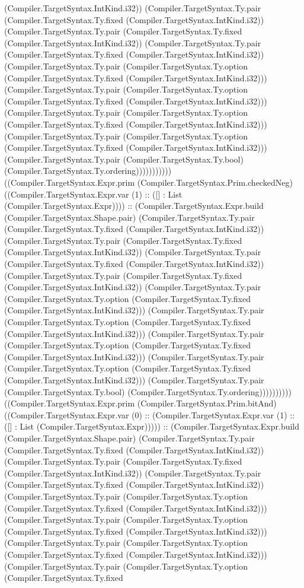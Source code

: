 \documentclass[11pt]{article}
\begin{document}
(Compiler.TargetSyntax.IntKind.i32)) (Compiler.TargetSyntax.Ty.pair (Compiler.TargetSyntax.Ty.fixed (Compiler.TargetSyntax.IntKind.i32)) (Compiler.TargetSyntax.Ty.pair (Compiler.TargetSyntax.Ty.fixed (Compiler.TargetSyntax.IntKind.i32)) (Compiler.TargetSyntax.Ty.pair (Compiler.TargetSyntax.Ty.fixed (Compiler.TargetSyntax.IntKind.i32)) (Compiler.TargetSyntax.Ty.pair (Compiler.TargetSyntax.Ty.option (Compiler.TargetSyntax.Ty.fixed (Compiler.TargetSyntax.IntKind.i32))) (Compiler.TargetSyntax.Ty.pair (Compiler.TargetSyntax.Ty.option (Compiler.TargetSyntax.Ty.fixed (Compiler.TargetSyntax.IntKind.i32))) (Compiler.TargetSyntax.Ty.pair (Compiler.TargetSyntax.Ty.option (Compiler.TargetSyntax.Ty.fixed (Compiler.TargetSyntax.IntKind.i32))) (Compiler.TargetSyntax.Ty.pair (Compiler.TargetSyntax.Ty.option (Compiler.TargetSyntax.Ty.fixed (Compiler.TargetSyntax.IntKind.i32))) (Compiler.TargetSyntax.Ty.pair (Compiler.TargetSyntax.Ty.bool) (Compiler.TargetSyntax.Ty.ordering))))))))))) ((Compiler.TargetSyntax.Expr.prim (Compiler.TargetSyntax.Prim.checkedNeg) ((Compiler.TargetSyntax.Expr.var (1) :: ([] : List (Compiler.TargetSyntax.Expr)))) :: (Compiler.TargetSyntax.Expr.build (Compiler.TargetSyntax.Shape.pair) (Compiler.TargetSyntax.Ty.pair (Compiler.TargetSyntax.Ty.fixed (Compiler.TargetSyntax.IntKind.i32)) (Compiler.TargetSyntax.Ty.pair (Compiler.TargetSyntax.Ty.fixed (Compiler.TargetSyntax.IntKind.i32)) (Compiler.TargetSyntax.Ty.pair (Compiler.TargetSyntax.Ty.fixed (Compiler.TargetSyntax.IntKind.i32)) (Compiler.TargetSyntax.Ty.pair (Compiler.TargetSyntax.Ty.fixed (Compiler.TargetSyntax.IntKind.i32)) (Compiler.TargetSyntax.Ty.pair (Compiler.TargetSyntax.Ty.option (Compiler.TargetSyntax.Ty.fixed (Compiler.TargetSyntax.IntKind.i32))) (Compiler.TargetSyntax.Ty.pair (Compiler.TargetSyntax.Ty.option (Compiler.TargetSyntax.Ty.fixed (Compiler.TargetSyntax.IntKind.i32))) (Compiler.TargetSyntax.Ty.pair (Compiler.TargetSyntax.Ty.option (Compiler.TargetSyntax.Ty.fixed (Compiler.TargetSyntax.IntKind.i32))) (Compiler.TargetSyntax.Ty.pair (Compiler.TargetSyntax.Ty.option (Compiler.TargetSyntax.Ty.fixed (Compiler.TargetSyntax.IntKind.i32))) (Compiler.TargetSyntax.Ty.pair (Compiler.TargetSyntax.Ty.bool) (Compiler.TargetSyntax.Ty.ordering)))))))))) ((Compiler.TargetSyntax.Expr.prim (Compiler.TargetSyntax.Prim.bitAnd) ((Compiler.TargetSyntax.Expr.var (0) :: (Compiler.TargetSyntax.Expr.var (1) :: ([] : List (Compiler.TargetSyntax.Expr))))) :: (Compiler.TargetSyntax.Expr.build (Compiler.TargetSyntax.Shape.pair) (Compiler.TargetSyntax.Ty.pair (Compiler.TargetSyntax.Ty.fixed (Compiler.TargetSyntax.IntKind.i32)) (Compiler.TargetSyntax.Ty.pair (Compiler.TargetSyntax.Ty.fixed (Compiler.TargetSyntax.IntKind.i32)) (Compiler.TargetSyntax.Ty.pair (Compiler.TargetSyntax.Ty.fixed (Compiler.TargetSyntax.IntKind.i32)) (Compiler.TargetSyntax.Ty.pair (Compiler.TargetSyntax.Ty.option (Compiler.TargetSyntax.Ty.fixed (Compiler.TargetSyntax.IntKind.i32))) (Compiler.TargetSyntax.Ty.pair (Compiler.TargetSyntax.Ty.option (Compiler.TargetSyntax.Ty.fixed (Compiler.TargetSyntax.IntKind.i32))) (Compiler.TargetSyntax.Ty.pair (Compiler.TargetSyntax.Ty.option (Compiler.TargetSyntax.Ty.fixed (Compiler.TargetSyntax.IntKind.i32))) (Compiler.TargetSyntax.Ty.pair (Compiler.TargetSyntax.Ty.option (Compiler.TargetSyntax.Ty.fixed 
\end{document}
